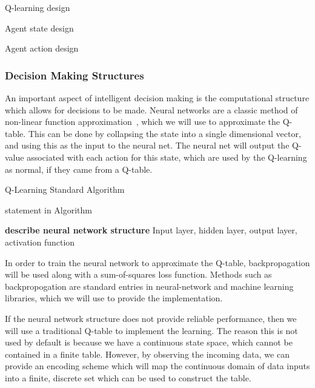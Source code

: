 \documentclass[draftclsnofoot,onecolumn,letterpaper,10pt]{IEEEtran}
\begin{document}
Q-learning design

Agent state design

Agent action design

\subsubsection{Decision Making Structures}
An important aspect of intelligent decision making is the computational structure which allows for decisions to be made.
Neural networks are a classic method of non-linear function approximation~\cite{RussellNorvig},  which we will use to approximate the Q-table.
This can be done by collapsing the state into a single dimensional vector, and using this as the input to the neural net.
The neural net will output the Q-value associated with each action for this state, which are used by the Q-learning as normal, if they came from a Q-table.


\begin{algorithm}[H]\label{alg:Qlearning}
	\caption{Q-Learning Standard Algorithm}
	statement in Algorithm

\end{algorithm}


\textbf{describe neural network structure}
Input layer, hidden layer, output layer, activation function

In order to train the neural network to approximate the Q-table, backpropagation will be used along with a sum-of-squares loss function.
Methods such as backpropogation are standard entries in neural-network and machine learning libraries, which we will use to provide the implementation.

If the neural network structure does not provide reliable performance, then we will use a traditional Q-table to implement the learning.
The reason this is not used by default is because we have a continuous state space, which cannot be contained in a finite table.
However, by observing the incoming data, we can provide an encoding scheme which will map the continuous domain of data inputs into a finite, discrete set which can be used to construct the table.
\end{document}
